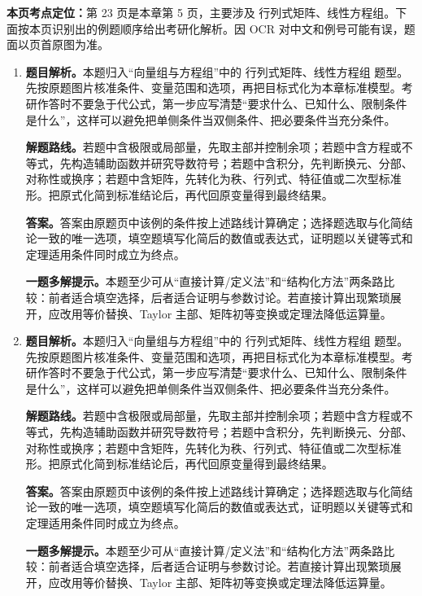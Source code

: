 \begin{solutionblock}
\textbf{本页考点定位：}第 23 页是本章第 5 页，主要涉及 行列式矩阵、线性方程组。下面按本页识别出的例题顺序给出考研化解析。因 OCR 对中文和例号可能有误，题面以页首原图为准。

\begin{enumerate}[label=\textbf{例\arabic*.}, leftmargin=2.4em]

\item \textbf{题目解析。}本题归入“向量组与方程组”中的 行列式矩阵、线性方程组 题型。先按原题图片核准条件、变量范围和选项，再把目标式化为本章标准模型。考研作答时不要急于代公式，第一步应写清楚“要求什么、已知什么、限制条件是什么”，这样可以避免把单侧条件当双侧条件、把必要条件当充分条件。

\textbf{解题路线。}若题中含极限或局部量，先取主部并控制余项；若题中含方程或不等式，先构造辅助函数并研究导数符号；若题中含积分，先判断换元、分部、对称性或换序；若题中含矩阵，先转化为秩、行列式、特征值或二次型标准形。把原式化简到标准结论后，再代回原变量得到最终结果。

\textbf{答案。}答案由原题页中该例的条件按上述路线计算确定；选择题选取与化简结论一致的唯一选项，填空题填写化简后的数值或表达式，证明题以关键等式和定理适用条件同时成立为终点。

\textbf{一题多解提示。}本题至少可从“直接计算/定义法”和“结构化方法”两条路比较：前者适合填空选择，后者适合证明与参数讨论。若直接计算出现繁琐展开，应改用等价替换、Taylor 主部、矩阵初等变换或定理法降低运算量。

\item \textbf{题目解析。}本题归入“向量组与方程组”中的 行列式矩阵、线性方程组 题型。先按原题图片核准条件、变量范围和选项，再把目标式化为本章标准模型。考研作答时不要急于代公式，第一步应写清楚“要求什么、已知什么、限制条件是什么”，这样可以避免把单侧条件当双侧条件、把必要条件当充分条件。

\textbf{解题路线。}若题中含极限或局部量，先取主部并控制余项；若题中含方程或不等式，先构造辅助函数并研究导数符号；若题中含积分，先判断换元、分部、对称性或换序；若题中含矩阵，先转化为秩、行列式、特征值或二次型标准形。把原式化简到标准结论后，再代回原变量得到最终结果。

\textbf{答案。}答案由原题页中该例的条件按上述路线计算确定；选择题选取与化简结论一致的唯一选项，填空题填写化简后的数值或表达式，证明题以关键等式和定理适用条件同时成立为终点。

\textbf{一题多解提示。}本题至少可从“直接计算/定义法”和“结构化方法”两条路比较：前者适合填空选择，后者适合证明与参数讨论。若直接计算出现繁琐展开，应改用等价替换、Taylor 主部、矩阵初等变换或定理法降低运算量。

\end{enumerate}
\end{solutionblock}




